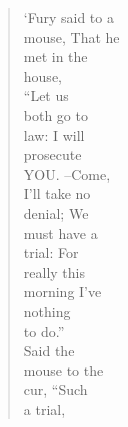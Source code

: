 \documentclass[12pt]{book}
\begin{document}
\begin{verse}
\hspace{2.2cm}                    `Fury said to a\\
\hspace{1.9cm}                   mouse, That he\\
\hspace{1.6cm}                 met in the\\
\hspace{1.3cm}               house,\\
\hspace{1.0cm}            ``Let us\\
\hspace{1.3cm}              both go to\\
\hspace{1.6cm}                law:  I will\\
\hspace{1.9cm}                  prosecute\\
\hspace{2.2cm}                    YOU.  --Come,\\
\hspace{2.5cm}                       I'll take no\\
\hspace{2.8cm}                        denial; We\\
\hspace{2.5cm}                     must have a\\
\hspace{2.2cm}                 trial:  For\\
\hspace{1.9cm}              really this\\
\hspace{1.6cm}           morning I've\\
\hspace{1.3cm}          nothing\\
\hspace{1.0cm}         to do.''\\
\hspace{1.3cm}           Said the\\
\hspace{1.6cm}             mouse to the\\
\hspace{1.9cm}               cur, ``Such\\
\hspace{2.2cm}                 a trial,\\

\end{verse}
\end{document}
